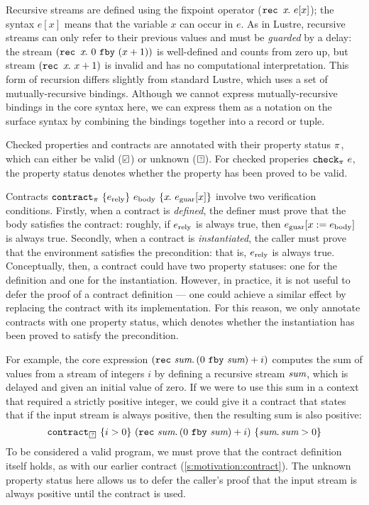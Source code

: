 Recursive streams are defined using the fixpoint operator ($\texttt{rec~} x\hspace{-0.1em}.~e[x]$); the syntax $e[x]$ means that the variable $x$ can occur in $e$.
As in Lustre, recursive streams can only refer to their previous values and must be \emph{guarded} by a delay: the stream $(\texttt{rec~} x\hspace{-0.1em}.~0~\texttt{fby}~(x + 1))$ is well-defined and counts from zero up, but stream $(\texttt{rec~} x\hspace{-0.1em}.~x + 1)$ is invalid and has no computational interpretation.
This form of recursion differs slightly from standard Lustre, which uses a set of mutually-recursive bindings.
Although we cannot express mutually-recursive bindings in the core syntax here, we can express them as a notation on the surface syntax by combining the bindings together into a record or tuple.

Checked properties and contracts are annotated with their property status $\pi$, which can either be valid ($\PSValid$) or unknown ($\PSUnknown$).
For checked properies $\texttt{check}_{\pi}~e$, the property status denotes whether the property has been proved to be valid.

Contracts $\texttt{contract}_{\pi}~\{e_{\text{rely}}\}~e_{\text{body}}~\{x\hspace{-0.1em}.~e_{\text{guar}}[x]\}$ involve two verification conditions.
Firstly, when a contract is \emph{defined}, the definer must prove that the body satisfies the contract: roughly, if $e_{\text{rely}}$ is always true, then $e_{\text{guar}}[x := e_{\text{body}}]$ is always true.
Secondly, when a contract is \emph{instantiated}, the caller must prove that the environment satisfies the precondition: that is, $e_{\text{rely}}$ is always true.
Conceptually, then, a contract could have two property statuses: one for the definition and one for the instantiation.
However, in practice, it is not useful to defer the proof of a contract definition --- one could achieve a similar effect by replacing the contract with its implementation.
For this reason, we only annotate contracts with one property status, which denotes whether the instantiation has been proved to satisfy the precondition.

For example, the core expression $(\texttt{rec}~\textit{sum}.\, (0~\texttt{fby}~\textit{sum}) + i)$ computes the sum of values from a stream of integers $i$ by defining a recursive stream $\textit{sum}$, which is delayed and given an initial value of zero.
If we were to use this sum in a context that required a strictly positive integer, we could give it a contract that states that if the input stream is always positive, then the resulting sum is also positive:
$$
\sumcontract
$$
To be considered a valid program, we must prove that the contract definition itself holds, as with our earlier contract (\autoref{s:motivation:contract}).
The unknown property status here allows us to defer the caller's proof that the input stream is always positive until the contract is used.


